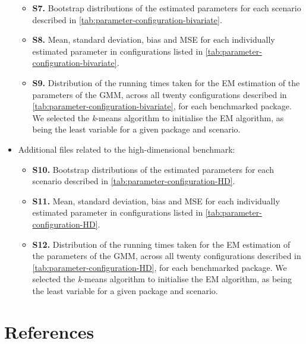 \begin{itemize}
  \begin{itemize}
  \item
    \textbf{S7.} Bootstrap distributions of the estimated parameters for each
    scenario described in \ref{tab:parameter-configuration-bivariate}.
  \item
    \textbf{S8.} Mean, standard deviation, bias and MSE for each individually
    estimated parameter in configurations listed in \ref{tab:parameter-configuration-bivariate}.
  \item
    \textbf{S9.} Distribution of the running times taken for the EM estimation of the parameters of the GMM, across all twenty configurations described in \ref{tab:parameter-configuration-bivariate}, for each benchmarked package. We selected the \emph{k}-means algorithm to initialise the EM algorithm, as being the least variable for a given package and scenario.
  \end{itemize}
\item
  Additional files related to the high-dimensional benchmark:

  \begin{itemize}
  \item
    \textbf{S10.} Bootstrap distributions of the estimated parameters for each
    scenario described in \ref{tab:parameter-configuration-HD}.
  \item
    \textbf{S11.} Mean, standard deviation, bias and MSE for each individually
    estimated parameter in configurations listed in \ref{tab:parameter-configuration-HD}.
  \item
    \textbf{S12.} Distribution of the running times taken for the EM estimation of the parameters of the GMM, across all twenty configurations described in \ref{tab:parameter-configuration-HD}, for each benchmarked package. We selected the \emph{k}-means algorithm to initialise the EM algorithm, as being the least variable for a given package and scenario.
  \end{itemize}
\end{itemize}

\hypertarget{references}{%
\section*{References}\label{references}}

